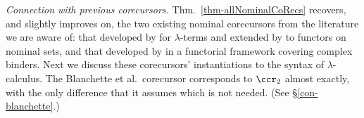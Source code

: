 
\smallskip
\emph{Connection with previous corecursors. } 
Thm.~\ref{thm-allNominalCoRecs} recovers, and slightly improves on, the two existing nominal corecursors from the literature we are aware of:  
that developed by \citet{DBLP:conf/cmcs/KurzPSV12} for $\lambda$-terms and extended 
by \citet{petrisanNominalCodatatypes} to functors on nominal sets, and that developed by \citet{DBLP:journals/pacmpl/BlanchetteGPT19} in a functorial framework covering complex binders. %
Next we discuss these corecursors' instantiations to the syntax of $\lambda$-calculus.   
The Blanchette et al.\ corecursor 
corresponds to $\ccr_2$ almost exactly, with the only difference that it %
assumes \IFvPm{} which is not needed. (See \S\ref{con-blanchette}.) %

